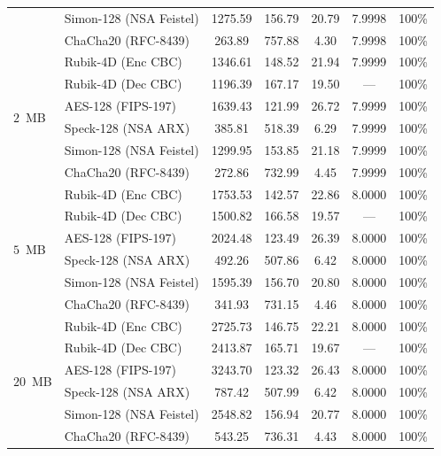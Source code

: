 \documentclass[10pt,twocolumn]{article}
\begin{document}
\begin{table}[t]
\begin{tabular}{@{}llccccc@{}}
 & Simon-128 (NSA Feistel)      & 1275.59 & 156.79 & 20.79 & 7.9998 & 100\% \\
 & ChaCha20 (RFC-8439)          & 263.89  & 757.88 & 4.30  & 7.9998 & 100\% \\ \midrule
\multirow{6}{*}{$2$~MB} 
 & Rubik-4D (Enc CBC)        & 1346.61 & 148.52 & 21.94 & 7.9999 & 100\% \\
 & Rubik-4D (Dec CBC)        & 1196.39 & 167.17 & 19.50 & --- & 100\% \\
 & AES-128 (FIPS-197)          & 1639.43 & 121.99 & 26.72 & 7.9999 & 100\% \\
 & Speck-128 (NSA ARX)          & 385.81  & 518.39 & 6.29  & 7.9999 & 100\% \\
 & Simon-128 (NSA Feistel)      & 1299.95 & 153.85 & 21.18 & 7.9999 & 100\% \\
 & ChaCha20 (RFC-8439)          & 272.86  & 732.99 & 4.45  & 7.9999 & 100\% \\ \midrule
\multirow{6}{*}{$5$~MB} 
 & Rubik-4D (Enc CBC)        & 1753.53 & 142.57 & 22.86 & 8.0000 & 100\% \\
 & Rubik-4D (Dec CBC)        & 1500.82 & 166.58 & 19.57 & --- & 100\% \\
 & AES-128 (FIPS-197)          & 2024.48 & 123.49 & 26.39 & 8.0000 & 100\% \\
 & Speck-128 (NSA ARX)          & 492.26  & 507.86 & 6.42  & 8.0000 & 100\% \\
 & Simon-128 (NSA Feistel)      & 1595.39 & 156.70 & 20.80 & 8.0000 & 100\% \\
 & ChaCha20 (RFC-8439)          & 341.93  & 731.15 & 4.46  & 8.0000 & 100\% \\ \midrule
\multirow{6}{*}{$20$~MB} 
 & Rubik-4D (Enc CBC)        & 2725.73 & 146.75 & 22.21 & 8.0000 & 100\% \\
 & Rubik-4D (Dec CBC)        & 2413.87 & 165.71 & 19.67 & --- & 100\% \\
 & AES-128 (FIPS-197)          & 3243.70 & 123.32 & 26.43 & 8.0000 & 100\% \\
 & Speck-128 (NSA ARX)          & 787.42  & 507.99 & 6.42  & 8.0000 & 100\% \\
 & Simon-128 (NSA Feistel)      & 2548.82 & 156.94 & 20.77 & 8.0000 & 100\% \\
  & ChaCha20 (RFC-8439)          & 543.25  & 736.31 & 4.43  & 8.0000 & 100\% \\ \bottomrule
\end{tabular}
\end{table}
\end{document}
